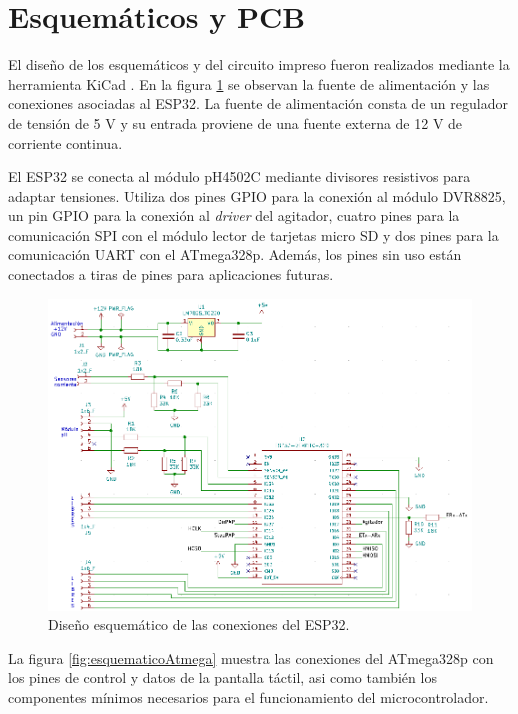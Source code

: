 \section{Esquemáticos y PCB}

El diseño de los esquemáticos y del circuito impreso fueron realizados mediante la herramienta KiCad \citep{WEBSITE:9}. En la figura \ref{fig:esquematicoESP} se observan la fuente de alimentación y las conexiones asociadas al ESP32. La fuente de alimentación consta de un regulador de tensión de 5 V y su entrada proviene de una fuente externa de 12 V de corriente continua.

El ESP32 se conecta al módulo pH4502C mediante divisores resistivos para adaptar tensiones. Utiliza dos pines GPIO para la conexión al módulo DVR8825, un pin GPIO para la conexión al \textit{driver} del agitador, cuatro pines para la comunicación SPI con el módulo lector de tarjetas micro SD y dos pines para la comunicación UART con el ATmega328p. Además, los pines sin uso están conectados a tiras de pines para aplicaciones futuras.

\begin{figure}[htbp]
	\centering
	\includegraphics[width=1.0\textwidth]{./Figures/esquematicoESP.png}
	\caption{Diseño esquemático de las conexiones del ESP32.}
	\label{fig:esquematicoESP}
\end{figure}

La figura \ref{fig:esquematicoAtmega} muestra las conexiones del ATmega328p con los pines de control y datos de la pantalla táctil, asi como también los componentes mínimos necesarios para el funcionamiento del microcontrolador.

